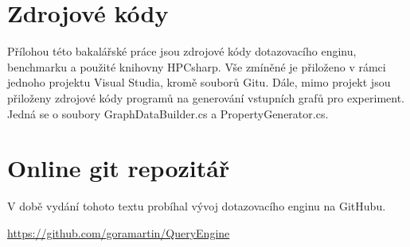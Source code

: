 \section{Zdrojové kódy}
\label{prilohy.kod}

Přílohou této bakalářské práce jsou zdrojové kódy dotazovacího enginu, benchmarku a použité knihovny HPCsharp.
Vše zmíněné je přiloženo v rámci jednoho projektu Visual Studia, kromě souborů Gitu. Dále, mimo projekt jsou přiloženy
zdrojové kódy programů na generování vstupních grafů pro experiment. Jedná se o soubory GraphDataBuilder.cs a PropertyGenerator.cs.

\section{Online git repozitář}
\label{prilohy.repo}

V době vydání tohoto textu probíhal vývoj dotazovacího enginu na GitHubu.

\begin{center}
\url{https://github.com/goramartin/QueryEngine}
\end{center}